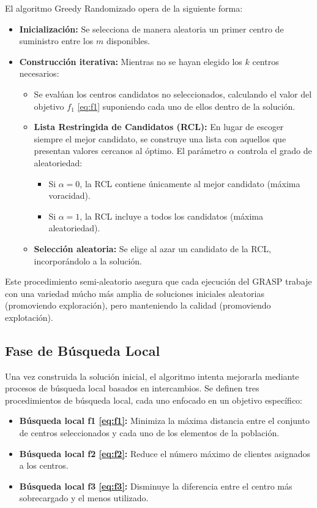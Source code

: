 \documentclass[12pt,a4paper]{book}
\begin{document}
El algoritmo Greedy Randomizado opera de la siguiente forma:  

\begin{itemize}
    \item \textbf{Inicialización:} Se selecciona de manera aleatoria un primer centro de suministro entre los $m$ disponibles.
    \item \textbf{Construcción iterativa:} Mientras no se hayan elegido los $k$ centros necesarios:
    \begin{itemize}
        \item Se evalúan los centros candidatos no seleccionados, calculando el valor del objetivo $f_1$ \ref{eq:f1} suponiendo cada uno de ellos dentro de la solución.
        \item \textbf{Lista Restringida de Candidatos (RCL):} En lugar de escoger siempre el mejor candidato, se construye una lista con aquellos que presentan valores cercanos al óptimo. El parámetro $\alpha$ controla el grado de aleatoriedad:
        \begin{itemize}
            \item Si $\alpha = 0$, la RCL contiene únicamente al mejor candidato (máxima voracidad).
            \item Si $\alpha = 1$, la RCL incluye a todos los candidatos (máxima aleatoriedad).
        \end{itemize}
        \item \textbf{Selección aleatoria:} Se elige al azar un candidato de la RCL, incorporándolo a la solución.
    \end{itemize}
\end{itemize}

Este procedimiento semi-aleatorio asegura que cada ejecución del GRASP trabaje con una variedad múcho más amplia de soluciones iniciales aleatorias (promoviendo exploración), pero manteniendo la calidad (promoviendo explotación).

\subsection{Fase de Búsqueda Local}
Una vez construida la solución inicial, el algoritmo intenta mejorarla mediante procesos de búsqueda local basados en intercambios.
Se definen tres procedimientos de búsqueda local, cada uno enfocado en un objetivo específico:  

\begin{itemize}
    \item \textbf{Búsqueda local f1 \ref{eq:f1}:} Minimiza la máxima distancia entre el conjunto de centros seleccionados y cada uno de los elementos de la población.
    \item \textbf{Búsqueda local f2 \ref{eq:f2}:} Reduce el número máximo de clientes asignados a los centros.
    \item \textbf{Búsqueda local f3 \ref{eq:f3}:} Disminuye la diferencia entre el centro más sobrecargado y el menos utilizado.
\end{itemize}
\end{document}
